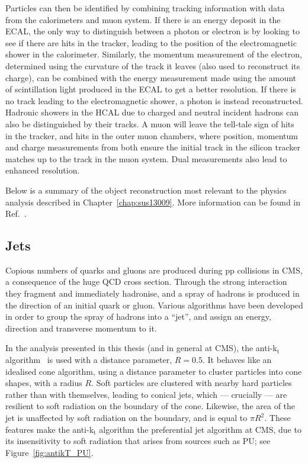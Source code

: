 Particles can then be identified by combining tracking information with data from the calorimeters and muon system.
If there is an energy deposit in the \ac{ECAL}, the only way to distinguish between a photon or electron is by looking to see if there are hits in the tracker, leading to the position of the electromagnetic shower in the calorimeter. 
Similarly, the momentum measurement of the electron, determined using the curvature of the track it leaves (also used to reconstruct its charge), can be combined with the energy measurement made using the amount of scintillation light produced in the \ac{ECAL} to get a better resolution.
If there is no track leading to the electromagnetic shower, a photon is instead reconstructed.
Hadronic showers in the \ac{HCAL} due to charged and neutral incident hadrons can also be distinguished by their tracks.
A muon will leave the tell-tale sign of hits in the tracker, and hits in the outer muon chambers, where position, momentum and charge measurements from both ensure the initial track in the silicon tracker matches up to the track in the muon system. Dual measurements also lead to enhanced resolution.


Below is a summary of the object reconstruction most relevant to the physics analysis described in Chapter~\ref{chap:sus13009}. 
More information can be found in Ref.~\cite{TDRVOL1}.


\subsection{Jets}
Copious numbers of quarks and gluons are produced during pp collisions in \ac{CMS}, a consequence of the huge \ac{QCD} cross section.
Through the strong interaction they fragment and immediately hadronise, and a spray of hadrons is produced in the direction of an initial quark or gluon.
Various algorithms have been developed in order to group the spray of hadrons into a ``jet'', and assign an energy, direction and transverse momentum to it.

In the analysis presented in this thesis (and in general at \ac{CMS}), the anti-k$_{\mathrm{t}}$ algorithm~\cite{bib:akjets} is used with a distance parameter, $R = 0.5$.
It behaves like an idealised cone algorithm, using a distance parameter to cluster particles into cone shapes, with a radius $R$. Soft particles are clustered with nearby hard particles rather than with themselves, leading to conical jets, which --- crucially --- are resilient to soft radiation on the boundary of the cone.
Likewise, the area of the jet is unaffected by soft radiation on the boundary, and is equal to $\pi R^{2}$. 
These features make the anti-k$_{\mathrm{t}}$ algorithm the preferential jet algorithm at \ac{CMS}, due to its insensitivity to soft radiation that arises from sources such as \ac{PU}; see Figure~\ref{fig:antikT_PU}. 

